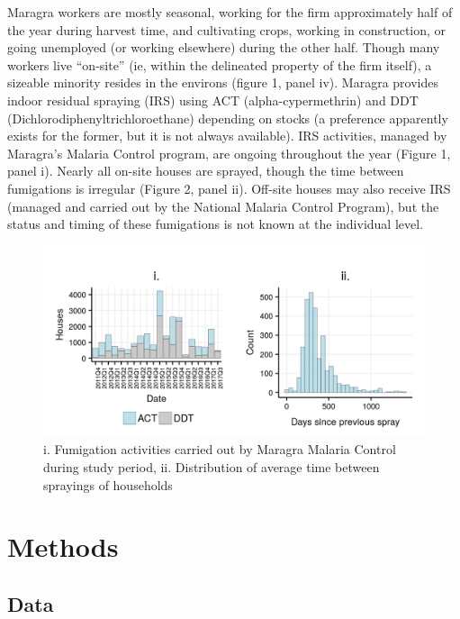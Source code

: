 \documentclass[]{article}
\begin{document}
Maragra workers are mostly seasonal, working for the firm approximately
half of the year during harvest time, and cultivating crops, working in
construction, or going unemployed (or working elsewhere) during the
other half. Though many workers live ``on-site'' (ie, within the
delineated property of the firm itself), a sizeable minority resides in
the environs (figure 1, panel iv). Maragra provides indoor residual
spraying (IRS) using ACT (alpha-cypermethrin) and DDT
(Dichlorodiphenyltrichloroethane) depending on stocks (a preference
apparently exists for the former, but it is not always available). IRS
activities, managed by Maragra's Malaria Control program, are ongoing
throughout the year (Figure 1, panel i). Nearly all on-site houses are
sprayed, though the time between fumigations is irregular (Figure 2,
panel ii). Off-site houses may also receive IRS (managed and carried out
by the National Malaria Control Program), but the status and timing of
these fumigations is not known at the individual level.

\begin{figure}[!h]

{\centering \includegraphics{figures/unnamed-chunk-16-1} 

}

\caption{i. Fumigation activities carried out by Maragra Malaria Control during study period, ii. Distribution of average time between sprayings of households}\label{fig:unnamed-chunk-16}
\end{figure}

\newpage

\section{Methods}\label{methods}

\subsection{Data}\label{data}
\end{document}

